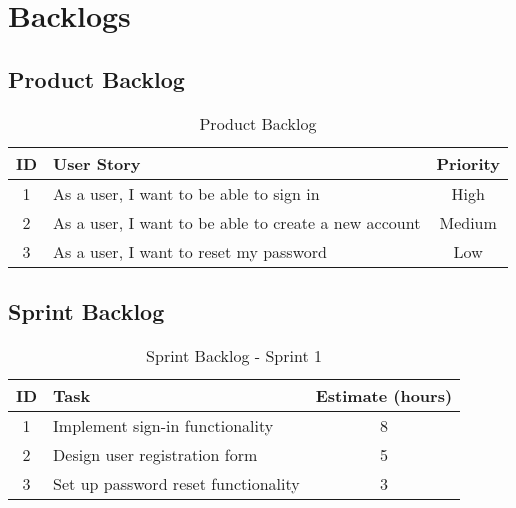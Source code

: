\chapter{Backlogs}\label{backlog}

\section{Product Backlog}\label{product_backlog}

\begin{table}[h]
    \centering
    \caption*{Product Backlog}
    \begin{tabular}{|c|p{5cm}|c|}
        \hline
        \textbf{ID} & \textbf{User Story} & \textbf{Priority} \\
        \hline
        1 & As a user, I want to be able to sign in & High \\
        \hline
        2 & As a user, I want to be able to create a new account & Medium \\
        \hline
        3 & As a user, I want to reset my password & Low \\
        \hline
    \end{tabular}
\end{table}

\section{Sprint Backlog}\label{sprint_backlog}

\begin{table}[h]
    \centering
    \caption*{Sprint Backlog - Sprint 1}
    \begin{tabular}{|c|p{5cm}|c|}
        \hline
        \textbf{ID} & \textbf{Task} & \textbf{Estimate (hours)} \\
        \hline
        1 & Implement sign-in functionality & 8 \\
        \hline
        2 & Design user registration form & 5 \\
        \hline
        3 & Set up password reset functionality & 3 \\
        \hline
    \end{tabular}
\end{table}
